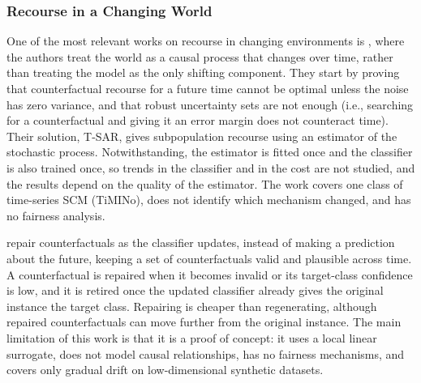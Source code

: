 \subsubsection{Recourse in a Changing World}
\label{subsec:lr-changing-world}
One of the most relevant works on recourse in changing environments is \citet{de2025time}, where the authors
treat the world as a causal process that changes over time, rather than treating the model as the only
shifting component. They start by proving that counterfactual recourse for a future time cannot be optimal
unless the noise has zero variance, and that robust uncertainty sets are not enough (i.e., searching for a
counterfactual and giving it an error margin does not counteract time). Their solution, T-SAR, gives
subpopulation recourse using an estimator of the stochastic process. Notwithstanding, the estimator is fitted
once and the classifier is also trained once, so trends in the classifier and in the cost are not studied,
and the results depend on the quality of the estimator. The work covers one class of time-series SCM
(TiMINo), does not identify which mechanism changed, and has no fairness analysis.

\citet{kostrzewa2026counterfactual} repair counterfactuals as the classifier updates, instead of making a
prediction about the future, keeping a set of counterfactuals valid and plausible across time. A
counterfactual is repaired when it becomes invalid or its target-class confidence is low, and it is retired
once the updated classifier already gives the original instance the target class. Repairing is cheaper than
regenerating, although repaired counterfactuals can move further from the original instance. The main
limitation of this work is that it is a proof of concept: it uses a local linear surrogate, does not model
causal relationships, has no fairness mechanisms, and covers only gradual drift on low-dimensional synthetic
datasets.

